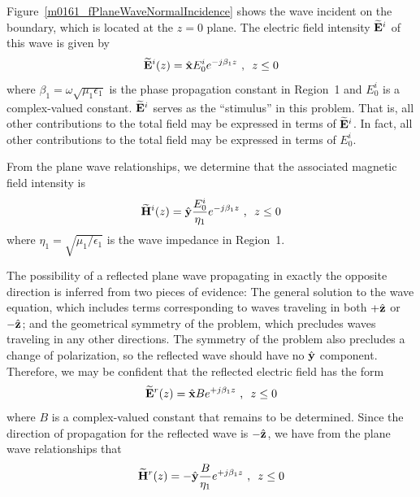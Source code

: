 Figure~\ref{m0161_fPlaneWaveNormalIncidence} shows the wave incident on the boundary, which is located at the $z=0$ plane.
The electric field intensity $\widetilde{\bf E}^i$ of this wave is given by
%
\begin{equation}
\widetilde{\bf E}^i(z) = \hat{\bf x} E_0^i e^{-j\beta_1 z}~\mbox{,}~~z \le 0
\label{m0161_eEi}
\end{equation}
%
where $\beta_1=\omega\sqrt{\mu_1 \epsilon_1}$ is the phase propagation constant in Region~1 and $E_0^i$ is a complex-valued constant. 
$\widetilde{\bf E}^i$ serves as the ``stimulus'' in this problem.
That is, all other contributions to the total field may be expressed in terms of $\widetilde{\bf E}^i$.
In fact, all other contributions to the total field may be expressed in terms of $E_0^i$.

From the plane wave relationships, we determine that the associated magnetic field intensity is
%
\begin{equation}
\widetilde{\bf H}^i(z) = \hat{\bf y} \frac{E_0^i}{\eta_1}  e^{-j\beta_1 z}~\mbox{,}~~z \le 0
\label{m0161_eHi}
\end{equation}
%
where $\eta_1=\sqrt{\mu_1 / \epsilon_1}$ is the wave impedance in Region~1.

The possibility of a reflected plane wave propagating in exactly the opposite direction is inferred from two pieces of evidence:
The general solution to the wave equation, which includes terms corresponding to waves traveling in both $+\hat{\bf z}$ or $-\hat{\bf z}$; and 
the geometrical symmetry of the problem, which precludes waves traveling in any other directions.
The symmetry of the problem also precludes a change of polarization, so the reflected wave should have no $\hat{\bf y}$ component. 
Therefore, we may be confident that the reflected electric field has the form
%
\begin{equation}
\widetilde{\bf E}^r(z) = \hat{\bf x} B e^{+j\beta_1 z}~\mbox{,}~~z \le 0
\label{m0161_eEr}
\end{equation}
%
where $B$ is a complex-valued constant that remains to be determined.  
Since the direction of propagation for the reflected wave is $-\hat{\bf z}$, we have from the plane wave relationships that
%
\begin{equation}
\widetilde{\bf H}^r(z) = -\hat{\bf y} \frac{B}{\eta_1} e^{+j\beta_1 z}~\mbox{,}~~z \le 0
\label{m0161_eHr}
\end{equation}

